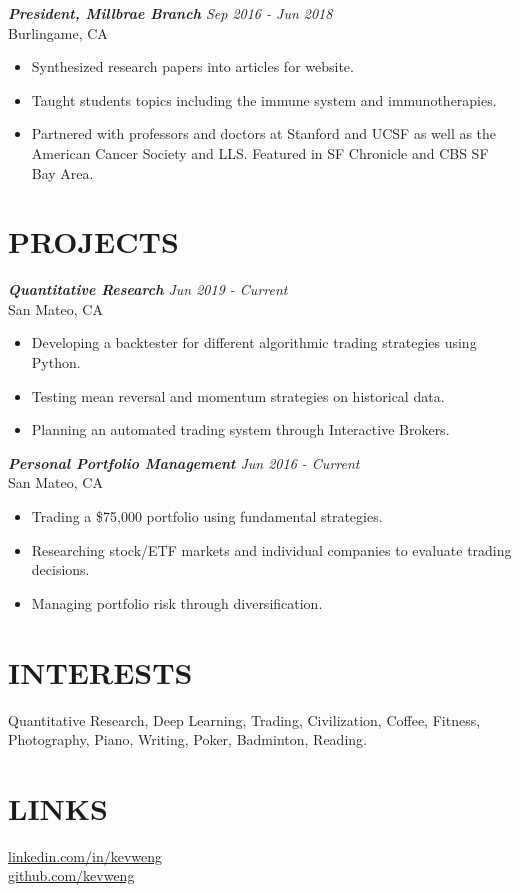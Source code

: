 \documentclass[margin, 10pt]{res} %
\begin{document}
\begin{resume}
{\sl {\bf President, Millbrae Branch} \hfill Sep 2016 - Jun 2018} \\
Burlingame, CA
\begin{itemize}  \itemsep -1pt
\item Synthesized research papers into articles for website. 
\item Taught students topics including the immune system and immunotherapies.
\item Partnered with professors and doctors at Stanford and UCSF as well as the American Cancer Society and LLS. Featured in SF Chronicle and CBS SF Bay Area.
\end{itemize} 




\section{\large PROJECTS} 

{\sl {\bf Quantitative Research} \hfill Jun 2019 - Current} \\
San Mateo, CA
\begin{itemize}  \itemsep -1pt
\item Developing a backtester for different algorithmic trading strategies using Python.
\item Testing mean reversal and momentum strategies on historical data.
\item Planning an automated trading system through Interactive Brokers.
\end{itemize} 

{\sl {\bf Personal Portfolio Management} \hfill Jun 2016 - Current} \\
San Mateo, CA
\begin{itemize}  \itemsep -1pt
\item Trading a \$75,000 portfolio using fundamental strategies.
\item Researching stock/ETF markets and individual companies to evaluate trading decisions.
\item Managing portfolio risk through diversification.
\end{itemize} 
\section{\large INTERESTS}
Quantitative Research, Deep Learning, Trading, Civilization, Coffee, Fitness, Photography, Piano, Writing, Poker, Badminton, Reading.

\section{\large LINKS}

\href{https://www.linkedin.com/in/kevweng/}{linkedin.com/in/kevweng}\\
\href{https://github.com/kevweng}{github.com/kevweng}

\end{resume}
\end{document}
